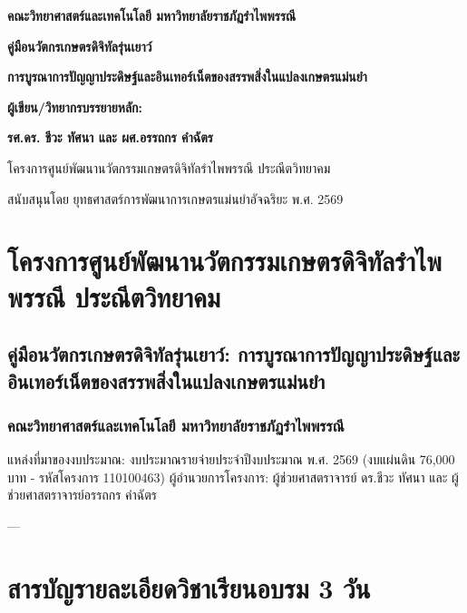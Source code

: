\documentclass[11pt,a4paper,openany]{report}
\begin{document}
\begin{titlepage}
    \centering
    \vspace*{2cm}
    {\large\bfseries คณะวิทยาศาสตร์และเทคโนโลยี มหาวิทยาลัยราชภัฏรำไพพรรณี\par}
    \vspace{2.5cm}
    {\Huge\bfseries คู่มือนวัตกรเกษตรดิจิทัลรุ่นเยาว์\par}
    \vspace{0.5cm}
    {\Large\bfseries การบูรณาการปัญญาประดิษฐ์และอินเทอร์เน็ตของสรรพสิ่งในแปลงเกษตรแม่นยำ\par}
    \vspace{2.5cm}
    {\large\bfseries ผู้เขียน/วิทยากรบรรยายหลัก:\par}
    \vspace{0.3cm}
    {\Large\bfseries รศ.ดร. ชีวะ ทัศนา และ ผศ.อรรถกร คำฉัตร\par}
    \vfill
    {\large โครงการศูนย์พัฒนานวัตกรรมเกษตรดิจิทัลรำไพพรรณี ประณีตวิทยาคม\par}
    {\large สนับสนุนโดย ยุทธศาสตร์การพัฒนาการเกษตรแม่นยำอัจฉริยะ พ.ศ. 2569\par}
\end{titlepage}

\tableofcontents
\newpage

\chapter{โครงการศูนย์พัฒนานวัตกรรมเกษตรดิจิทัลรำไพพรรณี ประณีตวิทยาคม}

\section{คู่มือนวัตกรเกษตรดิจิทัลรุ่นเยาว์: การบูรณาการปัญญาประดิษฐ์และอินเทอร์เน็ตของสรรพสิ่งในแปลงเกษตรแม่นยำ}

\subsection{คณะวิทยาศาสตร์และเทคโนโลยี มหาวิทยาลัยราชภัฏรำไพพรรณี}

แหล่งที่มาของงบประมาณ: งบประมาณรายจ่ายประจำปีงบประมาณ พ.ศ. 2569 (งบแผ่นดิน 76,000 บาท - รหัสโครงการ 110100463)
ผู้อำนวยการโครงการ: ผู้ช่วยศาสตราจารย์ ดร.ชีวะ ทัศนา และ ผู้ช่วยศาสตราจารย์อรรถกร คำฉัตร

---

\chapter*{สารบัญรายละเอียดวิชาเรียนอบรม 3 วัน}
\end{document}
